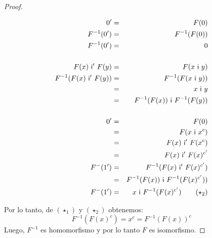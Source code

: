 \begin{proof}
\begin{multicols}{2}
        \begin{eqnarray*}
          0^{\prime} &=& F(0) \\
          F^{-1}(0^{\prime}) &=& F^{-1}(F(0)) \\
          F^{-1}(0^{\prime}) &=& 0 \\
          \\
          F(x) \ \IN^{\prime} \ F(y) &=& F(x \ \IN \ y) \\
          F^{-1}(F(x) \ \IN^{\prime} \ F(y)) &=& F^{-1}(F(x \ \IN \ y)) \\
          &=& x \ \IN \ y \\
          &=& F^{-1}(F(x)) \ \IN \ F^{-1}(F(y)) \\
          \\
          0^{\prime} &=& F(0) \\
          &=& F(x \ \IN \ x^{c}) \\
          &=& F(x) \ \IN^{\prime} \ F(x^{c}) \\
          &=& F(x) \ \IN^{\prime} \ F(x)^{c^{\prime}} \\
          F^{-}(1^{\prime}) &=& F^{-1}(F(x) \ \IN^{\prime} \ F(x)^{c^{\prime}}) \\
          &=& F^{-1}(F(x)) \ \IN \ F^{-1}(F(x)^{c^{\prime}})) \\
          F^{-}(1^{\prime}) &=& x \ \IN \ F^{-1}(F(x)^{c^{\prime}}) \qquad (\star_{2})
        \end{eqnarray*}
      \end{multicols}

      \PN Por lo tanto, de $(\star_{1})$ y $(\star_{2})$ obtenemos:
      \[
        F^{-1}(F(x)^{c}) = x^{c} = F^{-1}(F(x))^{c}
      \]
      \PN Luego, $F^{-1}$ es homomorfismo y por lo tanto $F$ es isomorfismo.
  \end{proof}

